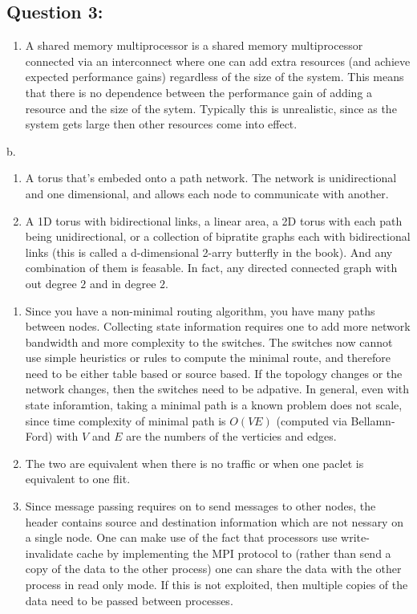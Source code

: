 \subsection{Question 3:}

\begin{enumerate}
\def\labelenumi{\alph{enumi}.}
\itemsep1pt\parskip0pt
\item
  A shared memory multiprocessor is a shared memory multiprocessor
  connected via an interconnect where one can add extra resources (and
  achieve expected performance gains) regardless of the size of the
  system. This means that there is no dependence between the performance
  gain of adding a resource and the size of the sytem. Typically this is
  unrealistic, since as the system gets large then other resources come
  into effect.
\end{enumerate}

b.

\begin{enumerate}
\def\labelenumi{\arabic{enumi}.}
\item
  A torus that's embeded onto a path network. The network is
  unidirectional and one dimensional, and allows each node to
  communicate with another.
\item
  A 1D torus with bidirectional links, a linear area, a 2D torus with
  each path being unidirectional, or a collection of bipratite graphs
  each with bidirectional links (this is called a d-dimensional 2-arry
  butterfly in the book). And any combination of them is feasable. In
  fact, any directed connected graph with out degree $2$ and in degree
  $2$.
\end{enumerate}

\begin{enumerate}
\def\labelenumi{\alph{enumi}.}
\setcounter{enumi}{2}
\item
  Since you have a non-minimal routing algorithm, you have many paths
  between nodes. Collecting state information requires one to add more
  network bandwidth and more complexity to the switches. The switches
  now cannot use simple heuristics or rules to compute the minimal
  route, and therefore need to be either table based or source based. If
  the topology changes or the network changes, then the switches need to
  be adpative. In general, even with state inforamtion, taking a minimal
  path is a known problem does not scale, since time complexity of
  minimal path is $O(VE)$ (computed via Bellamn-Ford) with $V$ and $E$
  are the numbers of the verticies and edges.
\item
  The two are equivalent when there is no traffic or when one paclet is
  equivalent to one flit.
\item
  Since message passing requires on to send messages to other nodes, the
  header contains source and destination information which are not
  nessary on a single node. One can make use of the fact that processors
  use write-invalidate cache by implementing the MPI protocol to (rather
  than send a copy of the data to the other process) one can share the
  data with the other process in read only mode. If this is not
  exploited, then multiple copies of the data need to be passed between
  processes.
\end{enumerate}

